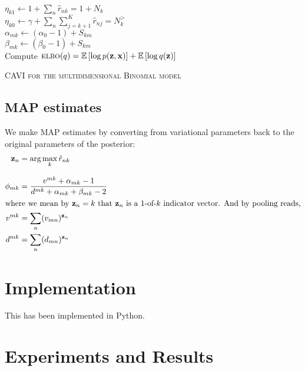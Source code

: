 \documentclass[11pt]{article}
\newcommand{\bx}{\ensuremath{\mathbf{x}}}
\newcommand{\bz}{\ensuremath{\mathbf{z}}}
\newcommand{\EE}[1]{\mathbb{E}\left[#1\right]}
\newcommand{\ELBO}{\textsc{elbo}}
\begin{document}
\begin{algorithm}[h]
{	\vspace{0.1cm}	
	 \\
		\hspace{1cm} $\eta_{k1} \leftarrow 1 + \sum_n \hat{r}_{nk} = 1 + N_k$ \\
		\hspace{1cm} $\eta_{k0} \leftarrow \gamma + \sum_n \sum_{j=k+1}^K \hat{r}_{nj} = N_k^>$\\
		\hspace{1cm} $\alpha_{mk} \leftarrow  (\alpha_0 - 1) + S_{km}$ \\
		\hspace{1cm} $ \beta_{mk} \leftarrow (\beta_0 - 1) + S_{km}$ \\
	\vspace{0.1cm}		
  Compute $\ELBO(q) = \EE{\log p(\bz, \bx)} + \EE{\log q(\bz)}$
}
\caption{\textsc{CAVI for the multidimensional Binomial model}}
\label{alg:cavi}
\end{algorithm}

\subsection{MAP estimates}
We make MAP estimates by converting from variational parameters back to the original parameters of the posterior:
\begin{align}
\bz_n &= \arg \max_k \hat{r}_{nk}  \\[8pt]
\phi_{mk} &= \frac{v^{mk} + \alpha_{mk} - 1}{d^{mk} + \alpha_{mk} + \beta_{mk} - 2}\\
\intertext{where we mean by $\bz_n = k$ that $\bz_n$ is a 1-of-$k$ indicator vector. And by pooling reads,}
v^{mk} &= \sum_n (v_{mn})^{\bz_n} \\
d^{mk} &= \sum_n (d_{mn})^{\bz_n}
\end{align}


\section{Implementation}
This has been implemented in Python.

\section{Experiments and Results}
\end{document}
